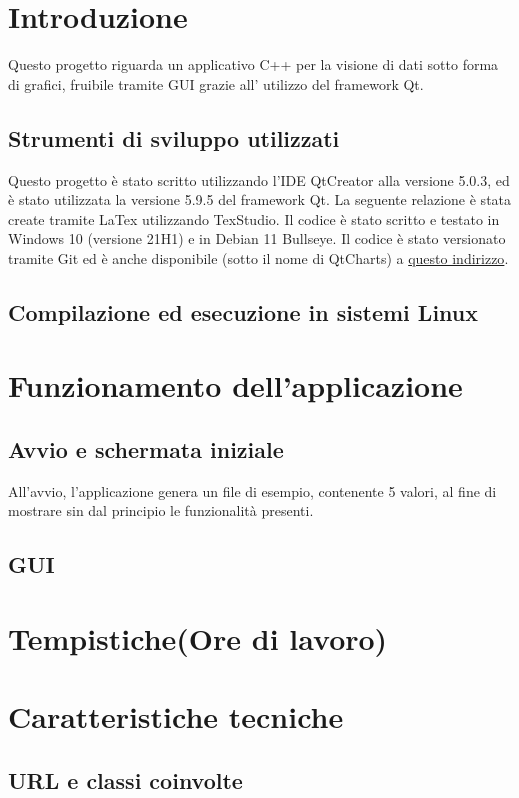 \documentclass[10pt]{article}
\begin{document}
    \newpage
    \tableofcontents
    \newpage
    \section{Introduzione}
     Questo progetto riguarda un applicativo C++ per la visione di dati sotto forma di grafici, fruibile tramite GUI grazie all' utilizzo del framework Qt.
    \subsection{Strumenti di sviluppo utilizzati}
    Questo progetto è stato scritto utilizzando l'IDE QtCreator alla versione 5.0.3, ed è stato utilizzata la versione 5.9.5 del framework Qt. 
    La seguente relazione è stata create tramite LaTex utilizzando TexStudio.
    Il codice è stato scritto e testato in Windows 10 (versione 21H1) e in Debian 11 Bullseye.
    Il codice è stato versionato tramite Git ed è anche disponibile (sotto il nome di QtCharts) a \href{https://github.com/nicolabaesso/qtCharts}{questo indirizzo}.
    \subsection{Compilazione ed esecuzione in sistemi Linux}
    \section{Funzionamento dell'applicazione}
    \subsection{Avvio e schermata iniziale}
    All'avvio, l'applicazione genera un file di esempio, contenente 5 valori, al fine di mostrare sin dal principio le funzionalità presenti.
    \subsection{GUI}
    \section{Tempistiche(Ore di lavoro)}
    \section{Caratteristiche tecniche}
    \subsection{URL e classi coinvolte}
\end{document}
